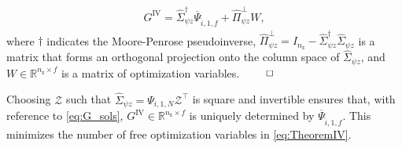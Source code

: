 \begin{align}\label{eq:G_sols}
    G^\mathrm{IV} = \hat{\Sigma}_{\psi z}^\dagger\overline{\Psi}_{\hat{i},1,f}+\hat{\Pi}_{\psi z}^\bot W,
\end{align}
where $\dagger$ indicates the Moore-Penrose pseudoinverse, ${\hat{\Pi}_{\psi z}^\bot=I_{n_\mathrm{z}}-\hat{\Sigma}_{\psi z}^\dagger\hat{\Sigma}_{\psi z}}$ is a matrix that forms an orthogonal projection onto the column space of $\hat{\Sigma}_{\psi z}$, and $W\in\mathbb{R}^{n_\mathrm{z}\times f}$ is a matrix of optimization variables. $\hfill\qed$

\setcounter{thm}{0}
\begin{rem}\label{rem:square_min_opt_var}
    Choosing $\mathcal{Z}$ such that $\hat{\Sigma}_{\psi z}=\Psi_{i,1,N}\mathcal{Z}^\top$ is square and invertible ensures that, with reference to \eqref{eq:G_sols}, $G^\mathrm{IV}\in\mathbb{R}^{n_\mathrm{z}\times f}$ is uniquely determined by $\overline{\Psi}_{\hat{i},1,f}$. This minimizes the number of free optimization variables in \eqref{eq:TheoremIV}.
\end{rem}

